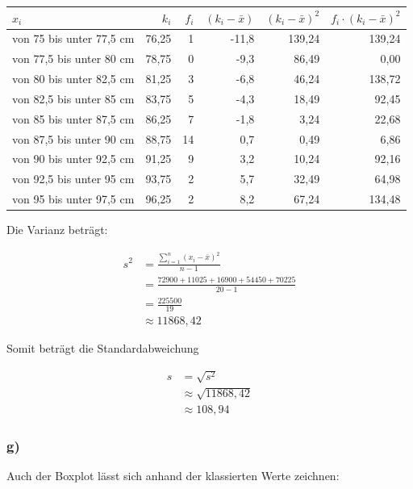 \documentclass[
  11pt,
  ngerman,
  a4paper,
]{report}
\begin{document}
\begin{table}[H]
\centering
\begin{tabular}{lrrrrr}
\toprule
$x_i$ & $k_i$ & $f_i$ & $(k_i - \bar{x})$ & $(k_i - \bar{x})^2$ & $f_i \cdot (k_i - \bar{x})^2$\\
\midrule
von 75 bis unter 77,5 cm & 76,25 & 1 & -11,8 & 139,24 & 139,24\\
von 77,5 bis unter 80 cm & 78,75 & 0 & -9,3 & 86,49 & 0,00\\
von 80 bis unter 82,5 cm & 81,25 & 3 & -6,8 & 46,24 & 138,72\\
von 82,5 bis unter 85 cm & 83,75 & 5 & -4,3 & 18,49 & 92,45\\
von 85 bis unter 87,5 cm & 86,25 & 7 & -1,8 & 3,24 & 22,68\\
von 87,5 bis unter 90 cm & 88,75 & 14 & 0,7 & 0,49 & 6,86\\
von 90 bis unter 92,5 cm & 91,25 & 9 & 3,2 & 10,24 & 92,16\\
von 92,5 bis unter 95 cm & 93,75 & 2 & 5,7 & 32,49 & 64,98\\
von 95 bis unter 97,5 cm & 96,25 & 2 & 8,2 & 67,24 & 134,48\\
\bottomrule
\end{tabular}
\end{table}

Die Varianz beträgt:

\[\begin{aligned}
  s^2&=\frac{\sum\limits_{i=1}^{n}(x_{i}-\bar{x})^2}{n-1} \\
     &=\frac{72900+11025+16900+54450+70225}{20-1}\\
     &=\frac{225500}{19}\\
     &\approx{11868{,}42}
\end{aligned}\]

Somit beträgt die Standardabweichung

\[\begin{aligned}
  s&=\sqrt{s^2}\\
   &\approx\sqrt{11868{,}42}\\
   &\approx108{,}94
\end{aligned}\]

\hypertarget{g}{%
\subsubsection{g)}\label{g}}

Auch der Boxplot lässt sich anhand der klassierten Werte zeichnen:
\end{document}
